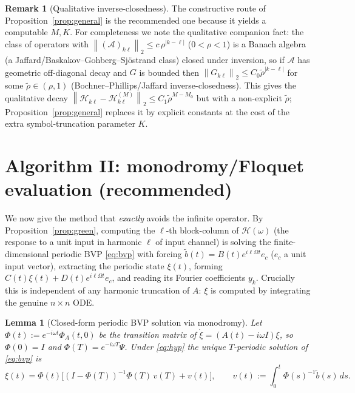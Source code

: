 \documentclass{amsart}
\newtheorem{lemma}{Lemma}
\theoremstyle{definition}
\newtheorem{remark}{Remark}
\newcommand{\norm}[1]{\left\lVert#1\right\rVert}
\newcommand{\Acal}{\mathcal{A}}
\newcommand{\Hcal}{\mathcal{H}}
\begin{document}
\begin{remark}[Qualitative inverse-closedness]\label{rem:general}
The constructive route of Proposition~\ref{prop:general} is the recommended one
because it yields a computable $M,K$. For completeness we note the qualitative
companion fact: the class of operators with
$\norm{(\Acal)_{k\ell}}_2\le c\,\rho^{|k-\ell|}$ ($0<\rho<1$) is a Banach algebra
(a Jaffard/Baskakov–Gohberg–Sjöstrand class) closed under inversion, so if
$\Acal$ has geometric off-diagonal decay and $G$ is bounded then
$\norm{G_{k\ell}}_2\le C_0\tilde\rho^{|k-\ell|}$ for some $\tilde\rho\in(\rho,1)$
(Bochner–Phillips/Jaffard inverse-closedness). This gives the qualitative decay
$\norm{\Hcal_{k\ell}-\Hcal^{(M)}_{k\ell}}_2\le C_1\tilde\rho^{M-M_0}$ but with a
non-explicit $\tilde\rho$; Proposition~\ref{prop:general} replaces it by explicit
constants at the cost of the extra symbol-truncation parameter $K$.
\end{remark}

\section{Algorithm II: monodromy/Floquet evaluation (recommended)}
\label{sec:mono}

We now give the method that \emph{exactly} avoids the infinite operator. By
Proposition~\ref{prop:green}, computing the $\ell$-th block-column of
$\Hcal(\omega)$ (the response to a unit input in harmonic $\ell$ of input
channel) is solving the finite-dimensional periodic BVP \eqref{eq:bvp} with
forcing $\tilde b(t)=B(t)e^{i\ell\Omega t}e_c$ ($e_c$ a unit input vector),
extracting the periodic state $\xi(t)$, forming $C(t)\xi(t)+D(t)e^{i\ell\Omega t}e_c$,
and reading its Fourier coefficients $y_k$. Crucially this is independent of any
harmonic truncation of $A$: $\xi$ is computed by integrating the genuine
$n\times n$ ODE.

\begin{lemma}[Closed-form periodic BVP solution via monodromy]\label{lem:monoform}
Let $\Phi(t):=e^{-i\omega t}\Phi_A(t,0)$ be the transition matrix of
$\dot\xi=(A(t)-i\omega I)\xi$, so $\Phi(0)=I$ and $\Phi(T)=e^{-i\omega T}\Psi$.
Under \eqref{eq:hyp} the unique $T$-periodic solution of \eqref{eq:bvp} is
\begin{equation}\label{eq:xiform}
\xi(t)=\Phi(t)\Big[(I-\Phi(T))^{-1}\Phi(T)\,v(T)+v(t)\Big],\qquad
v(t):=\int_0^t\Phi(s)^{-1}\tilde b(s)\,ds .
\end{equation}
\end{lemma}
\end{document}
